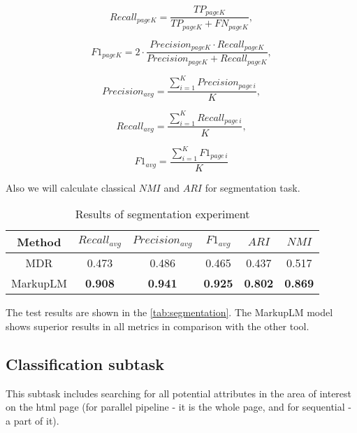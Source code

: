 $$
Recall_{page K} = \frac{TP_{page K}}{TP_{page K} + FN_{page K}},
$$

$$
F\textit{1}_{page K} = 2 \cdot \frac{Precision_{page K} \cdot Recall_{page K}}{Precision_{page K} + Recall_{page K}},
$$

$$
Precision_{avg} = \frac{\sum_{i = 1}^{K}Precision_{page\,i}}{K},
$$

$$
Recall_{avg} = \frac{\sum_{i = 1}^{K}Recall_{page\,i}}{K},
$$

$$
F\textit{1}_{avg} = \frac{\sum_{i = 1}^{K}F\textit{1}_{page\,i}}{K}
$$

Also we will calculate classical $NMI$\cite{Strehl2002} and $ARI$\cite{Hubert1985} for segmentation task.

\begin{table}[!htb]
    \caption{Results of segmentation experiment}
    \centering
        \begin{tabular}{c|ccc|cc}
        \toprule
        Method & $Recall_{avg}$ & $Precision_{avg}$ & $F\textit{1}_{avg}$ & $ARI$ & $NMI$\\
        \midrule
         MDR & 0.473 & 0.486 & 0.465 & 0.437 & 0.517\\
         MarkupLM & \textbf{0.908} & \textbf{0.941} & \textbf{0.925} & \textbf{0.802} & \textbf{0.869}\\
         \bottomrule
    \end{tabular}
    \label{tab:segmentation}
\end{table}

The test results are shown in the \autoref{tab:segmentation}. The MarkupLM model shows superior results in all metrics in comparison with the other tool.

\subsection{Classification subtask}
This subtask includes searching for all potential attributes in the area of interest on the html page (for parallel pipeline - it is the whole page, and for sequential - a part of it).

